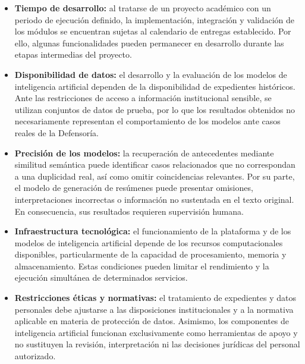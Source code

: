 \begin{itemize}

    \item \textbf{Tiempo de desarrollo:} al tratarse de un proyecto académico con un periodo de ejecución definido, la implementación, integración y validación de los módulos se encuentran sujetas al calendario de entregas establecido. Por ello, algunas funcionalidades pueden permanecer en desarrollo durante las etapas intermedias del proyecto.

    \item \textbf{Disponibilidad de datos:} el desarrollo y la evaluación de los modelos de inteligencia artificial dependen de la disponibilidad de expedientes históricos. Ante las restricciones de acceso a información institucional sensible, se utilizan conjuntos de datos de prueba, por lo que los resultados obtenidos no necesariamente representan el comportamiento de los modelos ante casos reales de la Defensoría.

    \item \textbf{Precisión de los modelos:} la recuperación de antecedentes mediante similitud semántica puede identificar casos relacionados que no correspondan a una duplicidad real, así como omitir coincidencias relevantes. Por su parte, el modelo de generación de resúmenes puede presentar omisiones, interpretaciones incorrectas o información no sustentada en el texto original. En consecuencia, sus resultados requieren supervisión humana.

    \item \textbf{Infraestructura tecnológica:} el funcionamiento de la plataforma y de los modelos de inteligencia artificial depende de los recursos computacionales disponibles, particularmente de la capacidad de procesamiento, memoria y almacenamiento. Estas condiciones pueden limitar el rendimiento y la ejecución simultánea de determinados servicios.

    \item \textbf{Restricciones éticas y normativas:} el tratamiento de expedientes y datos personales debe ajustarse a las disposiciones institucionales y a la normativa aplicable en materia de protección de datos. Asimismo, los componentes de inteligencia artificial funcionan exclusivamente como herramientas de apoyo y no sustituyen la revisión, interpretación ni las decisiones jurídicas del personal autorizado.

\end{itemize}